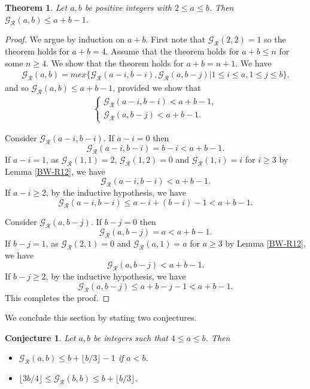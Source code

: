 \documentclass[12pt]{amsart}
\theoremstyle{plain}
\newtheorem{theorem}[proposition]{Theorem}
\newtheorem{conjecture}[proposition]{Conjecture}
\theoremstyle{definition}
\theoremstyle{remark}
\begin{document}
\smallskip
\begin{theorem} \label{BW-upper1}
Let $a,b$ be positive integers with $2 \leq a \leq b$. Then ${\mathcal{G}}_{\mathcal{R}}(a,b) \leq a+b-1$.
\end{theorem}

\begin{proof}
We argue by induction on $a+b$. First note that ${\mathcal{G}}_{\mathcal{R}}(2,2) = 1$ so the theorem holds for $a +b= 4$. Assume that the theorem holds for $a+ b \leq n$ for some $n \geq 4$. We show that the theorem holds for $a+b = n + 1$. We have
\begin{align*}
{\mathcal{G}}_{\mathcal{R}}(a,b) = mex \{{\mathcal{G}}_{\mathcal{R}}(a-i,b-i), {\mathcal{G}}_{\mathcal{R}}(a,b-j) | 1 \leq i \leq a, 1 \leq j \leq b\}.
\end{align*}
and so ${\mathcal{G}}_{\mathcal{R}}(a,b) \leq a+b-1$, provided we show that
\begin{align*}
\begin{cases}
{\mathcal{G}}_{\mathcal{R}}(a-i,b-i) < a+b-1, \\
{\mathcal{G}}_{\mathcal{R}}(a,b-j) < a+b-1.
\end{cases}
\end{align*}

Consider ${\mathcal{G}}_{\mathcal{R}}(a-i,b-i)$. If $a-i = 0$ then
\[{\mathcal{G}}_{\mathcal{R}}(a-i,b-i) = b-i < a+b-1.\]
If $a-i = 1$, as ${\mathcal{G}}_{\mathcal{R}}(1,1) = 2$, ${\mathcal{G}}_{\mathcal{R}}(1,2) = 0$ and ${\mathcal{G}}_{\mathcal{R}}(1,i) = i$ for $i \geq 3$ by Lemma \ref{BW-R12}, we have
\[{\mathcal{G}}_{\mathcal{R}}(a-i,b-i) < a+b-1.\]
If $a-i \geq 2$, by the inductive hypothesis, we have
\[{\mathcal{G}}_{\mathcal{R}}(a-i,b-i) \leq a-i + (b-i)-1 < a+b-1.\]

Consider ${\mathcal{G}}_{\mathcal{R}}(a,b-j)$.   If $b-j = 0$ then
\[{\mathcal{G}}_{\mathcal{R}}(a,b-j) = a < a+b-1.\]
If $b-j = 1$, as ${\mathcal{G}}_{\mathcal{R}}(2,1) = 0$ and ${\mathcal{G}}_{\mathcal{R}}(a,1)=a$ for $a \geq 3$ by Lemma \ref{BW-R12}, we have
\[{\mathcal{G}}_{\mathcal{R}}(a,b-j) < a+b-1.\]
If $b-j \geq 2$, by the inductive hypothesis, we have
\[{\mathcal{G}}_{\mathcal{R}}(a,b-j) \leq a+b-j-1 < a+b-1.\]
This completes the proof.
\end{proof}

\smallskip
We conclude this section by stating two conjectures.

\begin{conjecture} \label{BW-upper2}
Let $a, b$ be integers such that $4 \leq a \leq b$. Then
\begin{itemize}
\item ${\mathcal{G}}_{\mathcal{R}}(a,b) \leq b + \lfloor b/3 \rfloor - 1$ if $a < b$.
\item $\lfloor 3b/4 \rfloor \leq {\mathcal{G}}_{\mathcal{R}}(b,b) \leq b + \lfloor b/3 \rfloor$.
\end{itemize}
\end{conjecture}
\end{document}
